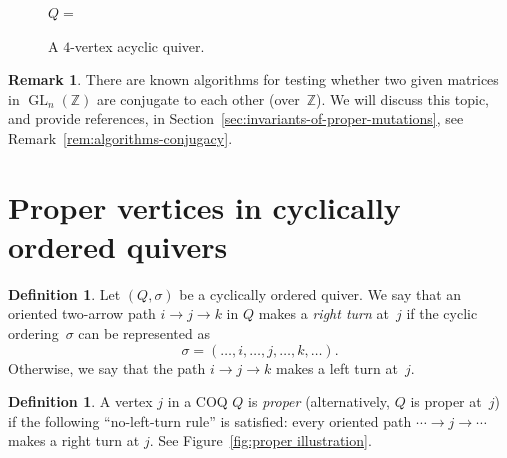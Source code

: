 \documentclass[11pt, letterpaper]{amsart}
\theoremstyle{definition}
\newtheorem{remark}[theorem]{Remark}
\newtheorem{definition}[theorem]{Definition}
\numberwithin{equation}{section}
\def\ZZ{{\mathbb Z}}
\def\GL{{\operatorname{GL}}}
\begin{document}
\begin{figure}[ht]
$Q =$ 

\caption{A $4$-vertex acyclic quiver. }
\label{fig:Q(a,b,c,d,e,f)}
\end{figure}

\begin{remark}
\label{rem:GLZ-conjugacy}
There are known algorithms for testing whether two given matrices in $\GL_n(\ZZ)$
are conjugate to each other (over~$\ZZ$). 
We will discuss this topic, and provide references, in Section~\ref{sec:invariants-of-proper-mutations},
see Remark~\ref{rem:algorithms-conjugacy}. 
\end{remark}



\newpage 


\section{Proper vertices in cyclically ordered quivers}
\label{sec:proper verts}

\begin{definition}
Let $(Q,\sigma)$ be a cyclically ordered quiver. 
We say that an oriented two-arrow path $i \rightarrow j \rightarrow k$ in $Q$ makes a \emph{right turn} at~$j$ 
if the cyclic ordering~$\sigma$ can be represented as 
\begin{equation*}
\sigma=(\dots,i,\dots,j,\dots,k,\dots). 
\end{equation*}
Otherwise, we say that the path $i \rightarrow j \rightarrow k$ makes a left turn at~$j$. 
\end{definition}

\begin{definition}
\label{def:proper}
A vertex $j$ in a COQ $Q$ is \emph{proper} (alternatively, $Q$ is proper at~$j$) 
if the following ``no-left-turn rule'' is satisfied: every oriented path $\cdots \rightarrow j \rightarrow \cdots$ makes a right turn at $j$. See Figure~\ref{fig:proper illustration}. 
\end{definition}
\end{document}
